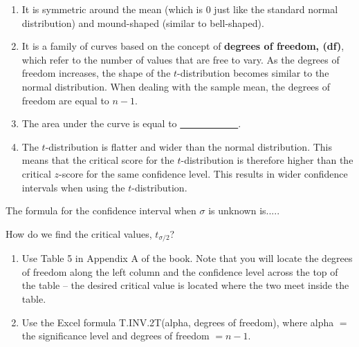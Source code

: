 \documentclass[12pt, letterpaper]{article}
\theoremstyle{definition}
\begin{document}
\begin{enumerate}

\item It is symmetric around the mean (which is $0$ just like the standard normal distribution) and mound-shaped (similar to bell-shaped).

\item It is a family of curves based on the concept of \textbf{degrees of freedom, (df)}, which refer to the number of values that are free to vary.  As the degrees of freedom increases, the shape of the $t$-distribution becomes similar to the normal distribution.  When dealing with the sample mean, the degrees of freedom are equal to $n-1$.

\item The area under the curve is equal to \underline{~~~~~~~~~~~~}.

\item The $t$-distribution is flatter and wider than the normal distribution.  This means that the critical score for the $t$-distribution is therefore higher than the critical $z$-score for the same confidence level.  This results in wider confidence intervals when using the $t$-distribution.

\end{enumerate}


\begin{statement}
The formula for the confidence interval when $\sigma$ is unknown is.....

\vspace*{.5in}

How do we find the critical values, $t_{\sigma/2}$?

\begin{enumerate}

\item Use Table 5 in Appendix A of the book.  Note that you will locate the degrees of freedom along the left column and the confidence level across the top of the table -- the desired critical value is located where the two meet inside the table.

\item Use the Excel formula T.INV.2T(alpha, degrees of freedom), where alpha $=$ the significance level and degrees of freedom $= n-1$.

\end{enumerate}

\end{statement}

\newpage
\end{document}
